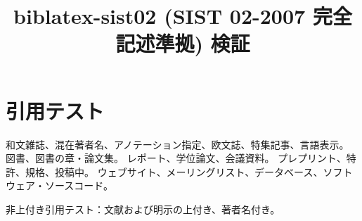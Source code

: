 \documentclass[
  article,paper=a4paper,fontsize=10pt,jlreq_notes,
  head_space=30truemm,foot_space=28truemm,gutter=24truemm,fore-edge=24truemm
]{jlreq}
\title{biblatex-sist02 (SIST 02-2007 完全記述準拠) 検証}
\author{}
\date{}
\begin{document}
\maketitle

\section*{引用テスト}
和文雑誌\cite{nishi2003}、混在著者名\cite{kennedy2005}、アノテーション指定\cite{annot2026}、欧文誌\cite{fan2006}、特集記事\cite{yamaguchi2005}、言語表示\cite{awano1979}。
図書\cite{shomei2003,miller2006,vanbreemen1998,lit_edition2025}、図書の章・論文集\cite{ikai2002,murashu2000,belar2004}。
レポート\cite{kadokura2005,yamamoto2004}、学位論文\cite{takeuchi2001}、会議資料\cite{nakamura2006,metoki2003,ashida2004}。
プレプリント\cite{wang2005}、特許\cite{mext2006patent,smith2004patent}、規格\cite{jis2002}、投稿中\cite{aiba2006}。
ウェブサイト\cite{sakamoto2005,smine2005}、メーリングリスト\cite{mckiernan2005}、データベース\cite{sdbs2006,kristensen2006}、ソフトウェア・ソースコード\cite{ooura2001,bibloom_src2026}。

非上付き引用テスト：文献および明示の上付き\supercite{shomei2003}、著者名付き\textcite{kennedy2005}。

\printbibliography[title=参考文献]
\end{document}
